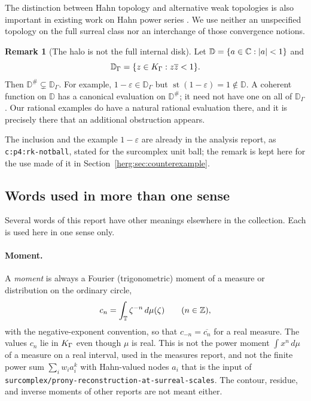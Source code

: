 \documentclass[11pt,letterpaper]{article}
\theoremstyle{definition}
\newtheorem{remark}[theorem]{Remark}
\newcommand{\Z}{\mathbb Z}\newcommand{\N}{\mathbb N}
\newcommand{\D}{\mathbb D}\newcommand{\No}{\mathbf{No}}
\newcommand{\st}{\operatorname{st}}
\newcommand{\eps}{\varepsilon}
\newcommand{\dd}{\,d}
\newcommand{\halo}[1]{#1^{\#}}
\newcommand{\repo}[1]{\nolinkurl{#1}}%
\newcommand{\lbl}[1]{\nolinkurl{#1}}%
\numberwithin{equation}{section}
\begin{document}
The distinction between Hahn topology and alternative weak topologies is also important in existing work on Hahn power series \cite{Flynn}. We use neither an unspecified topology on the full surreal class nor an interchange of those convergence notions.

\begin{remark}[The halo is not the full internal disk]\label{herg:rem:disk}
Let $\D=\{a\in\C:|a|<1\}$ and
\[
 \D_\Gamma=\{z\in\KG:z\overline z<1\}.
\]
Then $\halo\D\subsetneq\D_\Gamma$. For example, $1-\eps\in\D_\Gamma$ but $\st(1-\eps)=1\notin\D$. A coherent function on $\D$ has a canonical evaluation on $\halo\D$; it need not have one on all of $\D_\Gamma$. Our rational examples do have a natural rational evaluation there, and it is precisely there that an additional obstruction appears.

The inclusion and the example $1-\eps$ are already in the analysis report, as \lbl{c:p4:rk-notball}, stated for the surcomplex unit ball; the remark is kept here for the use made of it in Section~\ref{herg:sec:counterexample}.
\end{remark}

\subsection{Words used in more than one sense}
\label{herg:sec:conventions}

Several words of this report have other meanings elsewhere in the collection. Each is used here in one sense only.

\paragraph{Moment.}
A \emph{moment} is always a Fourier (trigonometric) moment of a measure or distribution on the ordinary circle,
\[
 c_n=\int_\T\zeta^{-n}\dd\mu(\zeta)\qquad(n\in\Z),
\]
with the negative-exponent convention, so that $c_{-n}=\overline{c_n}$ for a real measure. The values $c_n$ lie in $K_\Gamma$ even though $\mu$ is real. This is not the power moment $\int x^n\dd\mu$ of a measure on a real interval, used in the measures report, and not the finite power sum $\sum_iw_ia_i^k$ with Hahn-valued nodes $a_i$ that is the input of \repo{surcomplex/prony-reconstruction-at-surreal-scales}. The contour, residue, and inverse moments of other reports are not meant either.
\end{document}
